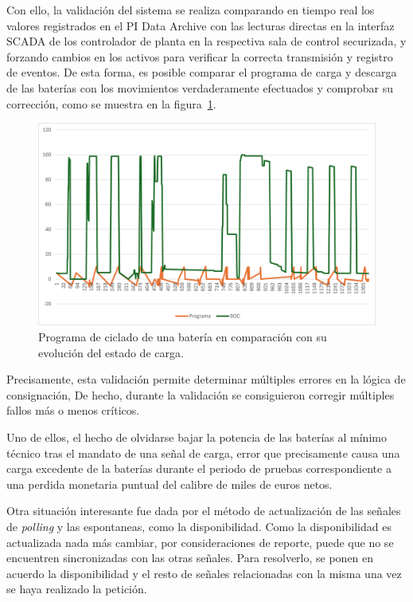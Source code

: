 Con ello, la validación del sistema se realiza comparando en tiempo real los valores registrados en el PI Data Archive con las lecturas directas en la interfaz SCADA de los controlador de planta en la respectiva sala de control securizada, y forzando cambios en los activos para verificar la correcta transmisión y registro de eventos. De esta forma, es posible comparar el programa de carga y descarga de las baterías con los movimientos verdaderamente efectuados y comprobar su corrección, como se muestra en la figura~\ref{fig:programa-bateria}.

\begin{figure}
  \centering
  \includegraphics[width=0.75\linewidth]{figures/programa-bateria.png}
  \caption[Programa de ciclado de una batería.]{Programa de ciclado de una batería en comparación con su evolución del estado de carga.}%
  \label{fig:programa-bateria}
\end{figure}

Precisamente, esta validación permite determinar múltiples errores en la lógica de consignación, De hecho, durante la validación se consiguieron corregir múltiples fallos más o menos críticos.

Uno de ellos, el hecho de olvidarse bajar la potencia de las baterías al mínimo técnico tras el mandato de una señal de carga, error que precisamente causa una carga excedente de la baterías durante el periodo de pruebas correspondiente a una perdida monetaria puntual del calibre de miles de euros netos.

Otra situación interesante fue dada por el método de actualización de las señales de \textit{polling} y las espontaneas, como la disponibilidad. Como la disponibilidad es actualizada nada más cambiar, por consideraciones de reporte, puede que no se encuentren sincronizadas con las otras señales. Para resolverlo, se ponen en acuerdo la disponibilidad y el resto de señales relacionadas con la misma una vez se haya realizado la petición.

